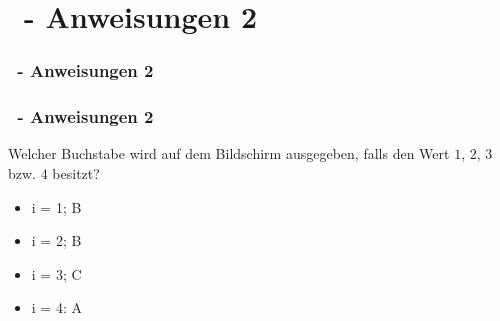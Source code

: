 \def\stitle{\theexercise\ - Anweisungen 2}
\section{\stitle}
\begin{frame}
    \frametitle{\stitle}
\tableofcontents[current]    
\end{frame}

\begin{frame}[t]%
    \frametitle{\stitle}
    
Welcher Buchstabe wird auf dem Bildschirm ausgegeben, falls  den Wert $1$, $2$, $3$ bzw. $4$ besitzt?

\pause

\begin{center}
\begin{minipage}{0.4\textwidth}
\begin{itemize}
\item i = 1; B
\item i = 2; B
\end{itemize}
\end{minipage}
\begin{minipage}{0.5\textwidth}
\begin{itemize}
\item i = 3; C
\item i = 4: A
\end{itemize}
\end{minipage}
\end{center}

\end{frame}